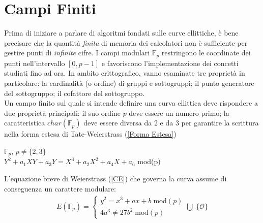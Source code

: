 \documentclass[a4paper,12pt]{tesiinfo}
\begin{document}
\section{Campi Finiti}
Prima di iniziare a parlare di algoritmi fondati sulle curve ellittiche, \`e bene precisare che la quantit\`a \textit{finita} di memoria dei calcolatori non \`e sufficiente per gestire punti di \textit{infinite} cifre. I campi modulari $\mathbb{F}_p$ restringono le coordinate dei punti nell'intervallo $[0, p-1]$ e favoriscono l'implementazione dei concetti studiati fino ad ora. In ambito crittografico, vanno esaminate tre propriet\`a in particolare: la cardinalit\`a (o ordine) di gruppi e sottogruppi; il punto generatore del sottogruppo; il cofattore del sottogruppo.
\\
Un campo finito sul quale si intende definire una curva ellittica deve rispondere a due propriet\`a principali: il suo ordine $p$ deve essere un numero primo; la caratteristica $char(\mathbb{F}_p)$ deve essere diversa da 2 e da 3 per garantire la scrittura nella forma estesa di Tate-Weierstrass (\ref{Forma Estesa})
\begin{center}
 $\mathbb{F}_p$, $p \ne \{2, 3\}$\\
 $Y^{2} + a_1XY + a_3Y =X^3 + a_2X^2 + a_4X + a_6$ mod(p)
\end{center} 
L'equazione breve di Weierstrass (\ref{CE}) che governa la curva assume di conseguenza un carattere modulare:
\begin{gather} E(\mathbb{F}_p) =
\begin{cases}
y^2 = x^3 + ax+b \; \text{mod}(p)\\
4a^3 \ne 27b^2 \; \text{mod}(p)
\end{cases}
\bigcup \; \{\mathcal{O}\}
\label{CE mod}
\end{gather}
%
%
%
%
%
%
%
%
%
%
%
\end{document}
